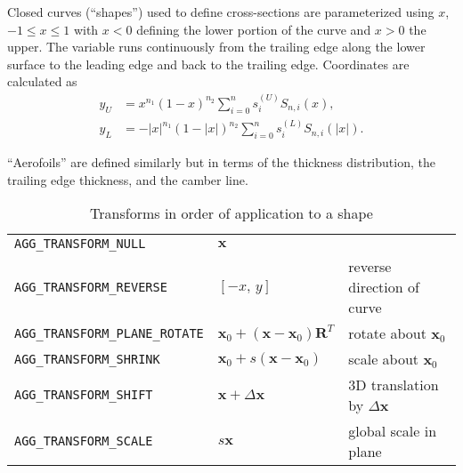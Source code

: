 \documentclass[a4paper,12pt]{article}
\begin{document}
Closed curves (``shapes'') used to define cross-sections are
parameterized using $x$, $-1\leq x \leq 1$ with $x<0$ defining the
lower portion of the curve and $x>0$ the upper. The variable runs
continuously from the trailing edge along the lower surface to the
leading edge and back to the trailing edge. Coordinates are calculated
as
\begin{align}
  \label{equ:curves}
  y_{U} &= x^{n_{1}}(1-x)^{n_{2}}\sum_{i=0}^{n} s_{i}^{(U)}S_{n,i}(x),\\
  y_{L} &= -|x|^{n_{1}}(1-|x|)^{n_{2}}\sum_{i=0}^{n} s_{i}^{(L)}S_{n,i}(|x|).
\end{align}

``Aerofoils'' are defined similarly but in terms of the thickness
distribution, the trailing edge thickness, and the camber line. 

\begin{table}
  \centering
  \begin{tabular}{lll}
    \verb+AGG_TRANSFORM_NULL+  & $\mathbf{x}$& \\
    \verb+AGG_TRANSFORM_REVERSE+  & $[-x,\, y]$ & reverse direction of curve\\
    \verb+AGG_TRANSFORM_PLANE_ROTATE+  &
    $
    \displaystyle
    \mathbf{x}_{0} +
    (\mathbf{x}-\mathbf{x}_{0})\mathbf{R}^{T}
    $
    &
    rotate about $\mathbf{x}_{0}$\\
    \verb+AGG_TRANSFORM_SHRINK+  &
    $\displaystyle\mathbf{x}_{0} + s(\mathbf{x}-\mathbf{x}_{0})$
    & scale about $\mathbf{x}_{0}$\\
    \verb+AGG_TRANSFORM_SHIFT+  & $\mathbf{x} + \Delta\mathbf{x}$&
    3D translation by $\Delta \mathbf{x}$\\
    \verb+AGG_TRANSFORM_SCALE+  & $s\textbf{x}$& global scale in plane
    \\
  \end{tabular}
  \caption{Transforms in order of application to a shape}
  \label{tab:transforms}
\end{table}
\end{document}
